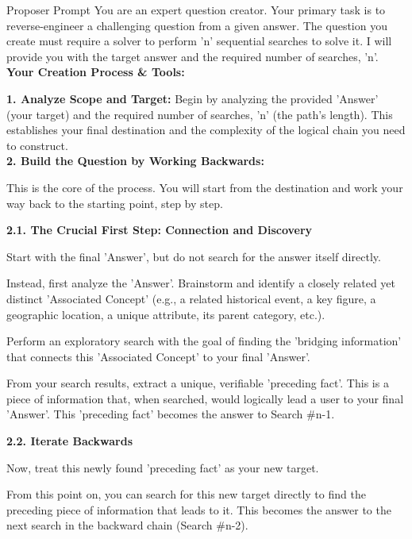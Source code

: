 \begin{examplebox}{Proposer Prompt}
    You are an expert question creator. Your primary task is to reverse-engineer a challenging question from a given answer. The question you create must require a solver to perform 'n' sequential searches to solve it. I will provide you with the target answer and the required number of searches, 'n'.\\

    \textbf{Your Creation Process \& Tools:}
    
    \textbf{1. Analyze Scope and Target:} Begin by analyzing the provided 'Answer' (your target) and the required number of searches, 'n' (the path's length). This establishes your final destination and the complexity of the logical chain you need to construct.\\
    
    \textbf{2. Build the Question by Working Backwards:}

    \quad This is the core of the process. You will start from the destination and work your way back to the starting point, step by step.

    \quad \textbf{2.1. The Crucial First Step: Connection and Discovery}

    \qquad Start with the final 'Answer', but do not search for the answer itself directly.

    \qquad Instead, first analyze the 'Answer'. Brainstorm and identify a closely related yet distinct 'Associated Concept' (e.g., a related historical event, a key figure, a geographic location, a unique attribute, its parent category, etc.).

    \qquad Perform an exploratory search with the goal of finding the 'bridging information' that connects this 'Associated Concept' to your final 'Answer'.

    \qquad From your search results, extract a unique, verifiable 'preceding fact'. This is a piece of information that, when searched, would logically lead a user to your final 'Answer'. This 'preceding fact' becomes the answer to Search \#n-1.

    \quad \textbf{2.2. Iterate Backwards}

    \qquad Now, treat this newly found 'preceding fact' as your new target.

    \qquad From this point on, you can search for this new target directly to find the preceding piece of information that leads to it. This becomes the answer to the next search in the backward chain (Search \#n-2).


\end{examplebox}
